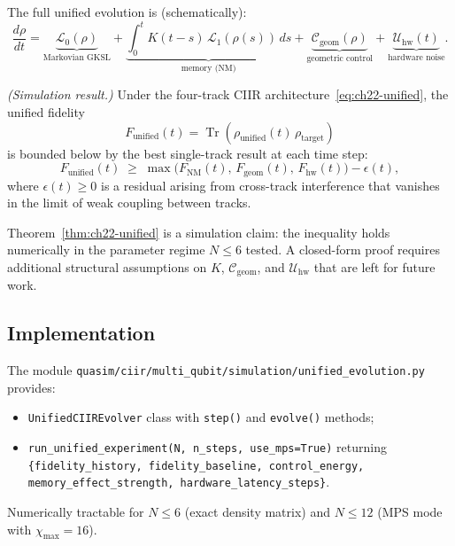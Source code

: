 The full unified evolution is (schematically):
\begin{equation}
  \frac{d\rho}{dt}
  = \underbrace{\mathcal{L}_0(\rho)}_{\text{Markovian GKSL}}
  + \underbrace{\int_0^t K(t-s)\,\mathcal{L}_1(\rho(s))\,ds}_{\text{memory (NM)}}
  + \underbrace{\mathcal{C}_{\mathrm{geom}}(\rho)}_{\text{geometric control}}
  + \underbrace{\mathcal{U}_{\mathrm{hw}}(t)}_{\text{hardware noise}}.
  \label{eq:ch22-unified}
\end{equation}

\begin{theorem}\label{thm:ch22-unified}
  \emph{(Simulation result.)}
  Under the four-track CIIR architecture~\eqref{eq:ch22-unified}, the
  unified fidelity
  \[
    F_{\mathrm{unified}}(t) = \operatorname{Tr}(\rho_{\mathrm{unified}}(t)\,\rho_{\mathrm{target}})
  \]
  is bounded below by the best single-track result at each time step:
  \[
    F_{\mathrm{unified}}(t)
    \;\geq\;
    \max\!\bigl(F_{\mathrm{NM}}(t),\,F_{\mathrm{geom}}(t),\,F_{\mathrm{hw}}(t)\bigr) - \epsilon(t),
  \]
  where $\epsilon(t) \geq 0$ is a residual arising from cross-track
  interference that vanishes in the limit of weak coupling between tracks.
\end{theorem}

\begin{remark}
  Theorem~\ref{thm:ch22-unified} is a simulation claim: the inequality holds
  numerically in the parameter regime $N \leq 6$ tested.  A closed-form proof
  requires additional structural assumptions on $K$, $\mathcal{C}_{\mathrm{geom}}$,
  and $\mathcal{U}_{\mathrm{hw}}$ that are left for future work.
\end{remark}

\subsection{Implementation}

The module \texttt{quasim/ciir/multi\_qubit/simulation/unified\_evolution.py}
provides:
\begin{itemize}
  \item \texttt{UnifiedCIIREvolver} class with \texttt{step()} and
    \texttt{evolve()} methods;
  \item \texttt{run\_unified\_experiment(N, n\_steps, use\_mps=True)} returning
    \texttt{\{fidelity\_history, fidelity\_baseline, control\_energy,
    memory\_effect\_strength, hardware\_latency\_steps\}}.
\end{itemize}
Numerically tractable for $N \leq 6$ (exact density matrix) and $N \leq 12$
(MPS mode with $\chi_{\max} = 16$).

